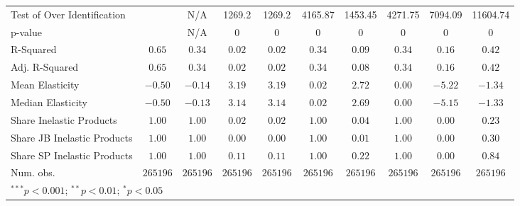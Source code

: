 \documentclass{article}
\begin{document}
\begin{appendices}
\begin{table}
{\begin{tabular}{l c c c c c c c c c}
Test of Over Identification &               & N/A           & 1269.2        & 1269.2        & 4165.87       & 1453.45       & 4271.75       & 7094.09       & 11604.74      \\
p-value                     &               & N/A           & 0             & 0             & 0             & 0             & 0             & 0             & 0             \\
R-Squared                   & $0.65$        & $0.34$        & $0.02$        & $0.02$        & $0.34$        & $0.09$        & $0.34$        & $0.16$        & $0.42$        \\
Adj. R-Squared              & $0.65$        & $0.34$        & $0.02$        & $0.02$        & $0.34$        & $0.08$        & $0.34$        & $0.16$        & $0.42$        \\
Mean Elasticity             & $-0.50$       & $-0.14$       & $3.19$        & $3.19$        & $0.02$        & $2.72$        & $0.00$        & $-5.22$       & $-1.34$       \\
Median Elasticity           & $-0.50$       & $-0.13$       & $3.14$        & $3.14$        & $0.02$        & $2.69$        & $0.00$        & $-5.15$       & $-1.33$       \\
Share Inelastic Products    & $1.00$        & $1.00$        & $0.02$        & $0.02$        & $1.00$        & $0.04$        & $1.00$        & $0.00$        & $0.23$        \\
Share JB Inelastic Products & $1.00$        & $1.00$        & $0.00$        & $0.00$        & $1.00$        & $0.01$        & $1.00$        & $0.00$        & $0.30$        \\
Share SP Inelastic Products & $1.00$        & $1.00$        & $0.11$        & $0.11$        & $1.00$        & $0.22$        & $1.00$        & $0.00$        & $0.84$        \\
Num. obs.                   & $265196$      & $265196$      & $265196$      & $265196$      & $265196$      & $265196$      & $265196$      & $265196$      & $265196$      \\
\bottomrule
\multicolumn{10}{l}{\scriptsize{$^{***}p<0.001$; $^{**}p<0.01$; $^{*}p<0.05$}}
\end{tabular}
    }
\end{table}
    

\end{appendices}
\end{document}
